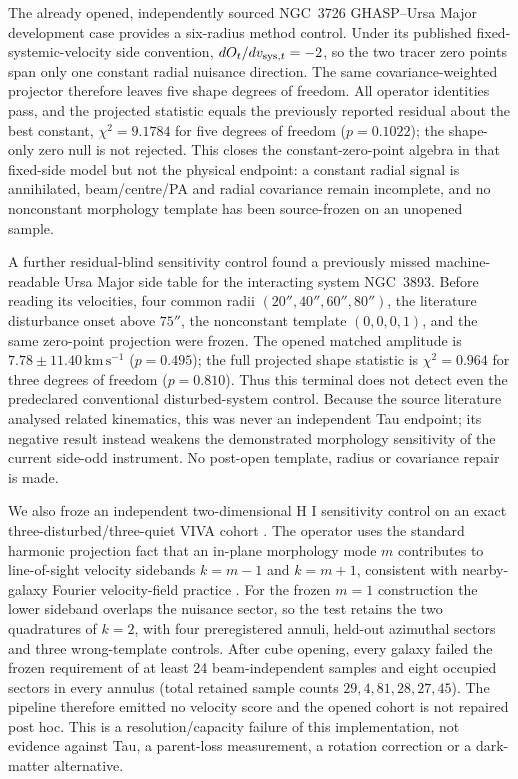\documentclass[11pt]{article}
\begin{document}
The already opened, independently sourced NGC~3726 GHASP--Ursa Major
development case provides a six-radius method control. Under its published
fixed-systemic-velocity side convention,
\(dO_t/dv_{{\rm sys},t}=-2\), so the two tracer zero points span only one
constant radial nuisance direction. The same covariance-weighted projector
therefore leaves five shape degrees of freedom. All operator identities pass,
and the projected statistic equals the previously reported residual about the
best constant, \(\chi^2=9.1784\) for five degrees of freedom
(\(p=0.1022\)); the shape-only zero null is not rejected. This closes the
constant-zero-point algebra in that fixed-side model but not the physical
endpoint: a constant radial signal is annihilated, beam/centre/PA and radial
covariance remain incomplete, and no nonconstant morphology template has been
source-frozen on an unopened sample.

A further residual-blind sensitivity control found a previously missed
machine-readable Ursa Major side table for the interacting system NGC~3893.
Before reading its velocities, four common radii
\((20'',40'',60'',80'')\), the literature disturbance onset above \(75''\),
the nonconstant template \((0,0,0,1)\), and the same zero-point projection
were frozen. The opened matched amplitude is
\(7.78\pm11.40\,\mathrm{km\,s^{-1}}\) (\(p=0.495\)); the full projected
shape statistic is \(\chi^2=0.964\) for three degrees of freedom
(\(p=0.810\)). Thus this terminal does not detect even the predeclared
conventional disturbed-system control. Because the source literature analysed
related kinematics, this was never an independent Tau endpoint; its negative
result instead weakens the demonstrated morphology sensitivity of the current
side-odd instrument. No post-open template, radius or covariance repair is
made.

We also froze an independent two-dimensional H I sensitivity control on an
exact three-disturbed/three-quiet VIVA cohort \cite{Chung2009VIVA}.  The
operator uses the standard harmonic projection fact that an in-plane
morphology mode $m$ contributes to line-of-sight velocity sidebands
$k=m-1$ and $k=m+1$, consistent with nearby-galaxy Fourier velocity-field
practice \cite{Salak2019COMING}.  For the frozen $m=1$ construction the
lower sideband overlaps the nuisance sector, so the test retains the two
quadratures of $k=2$, with four preregistered annuli, held-out azimuthal
sectors and three wrong-template controls.  After cube opening, every galaxy
failed the frozen requirement of at least 24 beam-independent samples and
eight occupied sectors in every annulus (total retained sample counts
$29,4,81,28,27,45$).  The pipeline therefore emitted no velocity score and
the opened cohort is not repaired post hoc.  This is a resolution/capacity
failure of this implementation, not evidence against Tau, a parent-loss
measurement, a rotation correction or a dark-matter alternative.
\end{document}
